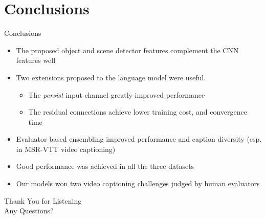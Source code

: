 \documentclass{beamer}
\begin{document}
\section{Conclusions}
\begin{frame}{Conclusions}
\begin{itemize}
    \item The proposed object and scene detector features complement the CNN features well 
    \item Two extensions proposed to the language model were useful. 
       \begin{itemize}
           \item The \emph{persist} input channel greatly improved performance
           \item The residual connections achieve lower training cost, and convergence time
       \end{itemize}
    \item Evaluator based ensembling improved performance and caption diversity (esp. in MSR-VTT video captioning)
    \item Good performance was achieved in all the three datasets
    \item Our models won two video captioning challenges judged by human evaluators 
\end{itemize}
\end{frame}
\begin{frame}{}
\begin{center}
    \Large Thank You for Listening\\[6mm]
    \Large Any Questions? 
\end{center}
\end{frame}
\end{document}
